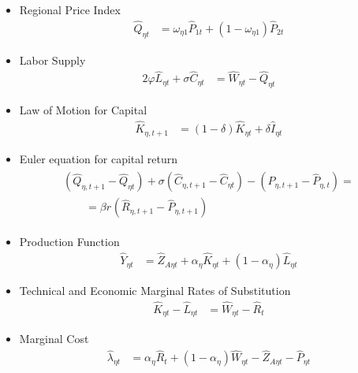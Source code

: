\documentclass[../thesis.tex]{subfiles}
\begin{document}
{\begin{itemize}
			\item Regional Price Index
			\begin{align}
				\hat{Q}_{\eta t} &= \omega_{\eta 1} \hat{P}_{1 t} + (1 -\omega_{\eta 1}) \hat{P}_{2 t} \label{eq_v2:reg-total-expense-level-ll}
			\end{align}
			
			\item Labor Supply
			\begin{alignat}{2}
				\varphi \hat{L}_{\eta t} + \sigma \hat{C}_{\eta t} &= \hat{W}_{\eta t} - \hat{Q}_{\eta t} \label{eq_v2:reg-ll-labor-supply}
			\end{alignat}
			
			\item Law of Motion for Capital
			\begin{align}
				\hat{K}_{\eta, t+1} &= (1-\delta) \hat{K}_{\eta t} + \delta \hat{I}_{\eta t} \label{eq_v2:reg-ll-law-of-motion-for-capital}
			\end{align}
			
			\item Euler equation for capital return
			\begin{align}
				\begin{split}
					(\hat{Q}_{\eta, t+1} - \hat{Q}_{\eta t}) + \sigma(\hat{C}_{\eta, t+1} - \hat{C}_{\eta t}) - (\hat{P}_{\eta, t+1} - \hat{P}_{\eta, t}) = \\
					\qquad = \beta r_{}(\hat{R}_{\eta, t+1} - \hat{P}_{\eta, t+1})
				\end{split} \label{eq_v2:reg-ll-capital-euler-equation}
			\end{align}
			
			\item Production Function
			\begin{align}
				\hat{Y}_{\eta t} &= \hat{Z}_{A\eta t} + {\alpha_{\eta}} \hat{K}_{\eta t} + (1-\alpha_{\eta}) \hat{L}_{\eta t} \label{eq_v2:reg-ll-final-goods-firm-bundle-rule-3}
			\end{align}
			
			\item Technical and Economic Marginal Rates of Substitution %
			\begin{align}
				\hat{K}_{\eta t} - \hat{L}_{\eta t} &= \hat{W}_{\eta t} - \hat{R}_{t} \label{eq_v2:reg-ll-int-good-firm-TMRS}
			\end{align}
			
			\item Marginal Cost
			\begin{align}
				\hat{\lambda}_{\eta t} &= {\alpha_{\eta}} \hat{R}_{t} + (1- {\alpha_{\eta}}) \hat{W}_{\eta t} - \hat{Z}_{A\eta t} - \hat{P}_{\eta t} \label{eq_v2:reg-ll-int-good-firm-MC-3}
			\end{align}
			

\end{itemize}}
\end{document}
